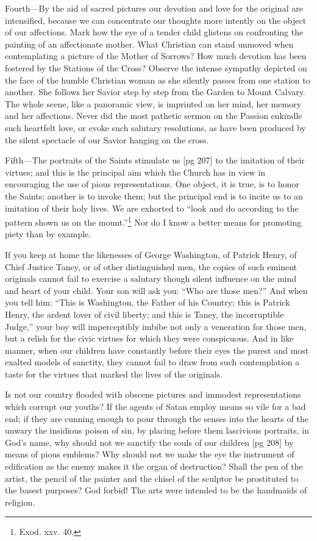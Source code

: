 Fourth—By the aid of sacred pictures our devotion
and love for the original are intensified,
because we can concentrate our thoughts more intently
on the object of our affections. Mark how
the eye of a tender child glistens on confronting
the painting of an affectionate mother. What
Christian can stand unmoved when contemplating
a picture of the Mother of Sorrows? How
much devotion has been fostered by the Stations
of the Cross? Observe the intense sympathy depicted
on the face of the humble Christian woman
as she silently passes from one station to another.
She follows her Savior step by step from the
Garden to Mount Calvary. The whole scene, like
a panoramic view, is imprinted on her mind, her
memory and her affections. Never did the most
pathetic sermon on the Passion enkindle such
heartfelt love, or evoke such salutary resolutions,
as have been produced by the silent spectacle of
our Savior hanging on the cross.

Fifth—The portraits of the Saints stimulate us
[pg 207]
to the imitation of their virtues; and this is the
principal aim which the Church has in view in encouraging
the use of pious representations. One
object, it is true, is to honor the Saints; another
is to invoke them; but the principal end is to incite
us to an imitation of their holy lives. We
are exhorted to “look and do according to the
pattern shown us on the mount.”\footnote{Exod. xxv. 40.} Nor do I
know a better means for promoting piety than by
example.

If you keep at home the likenesses of George
Washington, of Patrick Henry, of Chief Justice
Taney, or of other distinguished men, the copies
of such eminent originals cannot fail to exercise
a salutary though silent influence on the mind and
heart of your child. Your son will ask you: “Who
are those men?” And when you tell him: “This
is Washington, the Father of his Country; this
is Patrick Henry, the ardent lover of civil liberty;
and this is Taney, the incorruptible Judge,” your
boy will imperceptibly imbibe not only a veneration
for those men, but a relish for the civic virtues
for which they were conspicuous. And in like
manner, when our children have constantly before
their eyes the purest and most exalted models of
sanctity, they cannot fail to draw from such contemplation
a taste for the virtues that marked
the lives of the originals.

Is not our country flooded with obscene pictures
and immodest representations which corrupt our
youths? If the agents of Satan employ means so
vile for a bad end; if they are cunning enough
to pour through the senses into the hearts of the
unwary the insidious poison of sin, by placing before
them lascivious portraits, in God's name, why
should not we sanctify the souls of our children
[pg 208]
by means of pious emblems? Why should not we
make the eye the instrument of edification as the
enemy makes it the organ of destruction? Shall
the pen of the artist, the pencil of the painter and
the chisel of the sculptor be prostituted to the
basest purposes? God forbid! The arts were intended
to be the handmaids of religion.

